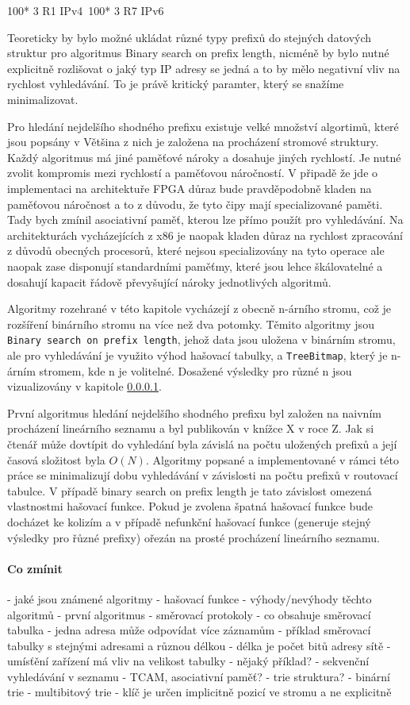 100* 3 R1 IPv4\
100* 3 R7 IPv6\

Teoreticky by bylo možné ukládat různé typy prefixů do stejných datových struktur pro algoritmus
Binary search on prefix length, nicméně by bylo nutné explicitně rozlišovat o jaký typ IP adresy se
jedná a to by mělo negativní vliv na rychlost vyhledávání. To je právě kritický paramter, který
se snažíme minimalizovat.

Pro hledání nejdelšího shodného prefixu existuje velké množství algortimů, které jsou popsány v \cite{}
Většina z nich je založena na procházení stromové struktury. Každý algoritmus má jiné paměťové nároky
a dosahuje jiných rychlostí. Je nutné zvolit kompromis mezi rychlostí a paměťovou náročností.
V připadě že jde o implementaci na architektuře FPGA důraz bude pravděpodobně kladen na paměťovou náročnost
a to z důvodu, že tyto čipy mají specializované paměti. Tady bych zmínil asociativní paměť, kterou
lze přímo použít pro vyhledávání. Na architekturách vycházejících z x86 je naopak kladen důraz
na rychlost zpracování z důvodů obecných procesorů, které nejsou specializovány na tyto operace
ale naopak zase disponují standardními paměťmy, které jsou lehce škálovatelné a dosahují kapacit
řádově převyšující nároky jednotlivých algoritmů.

Algoritmy rozehrané v této kapitole vycházejí z obecně n-árního stromu,
což je rozšíření binárního stromu na více než dva potomky. Těmito algoritmy jsou
\texttt{Binary search on prefix length}, jehož data jsou uložena v binárním stromu, ale pro vyhledávání
je využito výhod hašovací tabulky, a \texttt{TreeBitmap}, který je n-árním stromem, kde n je volitelné.
Dosažené výsledky pro různé n jsou vizualizovány v kapitole \ref{}.

První algoritmus hledání nejdelšího shodného prefixu byl založen na naivním procházení lineárního
seznamu a byl publikován v knížce X v roce Z. Jak si čtenář může dovtípit do vyhledání
byla závislá na počtu uložených prefixů a její časová složitost byla $O(N)$.
Algoritmy popsané a implementované v rámci této práce se minimalizují dobu vyhledávání v závislosti
na počtu prefixů v routovací tabulce. V případě binary search on prefix length je tato závislost
omezená vlastnostmi hašovací funkce. Pokud je zvolena špatná hašovací funkce bude docházet ke kolizím
a v případě nefunkční hašovací funkce (generuje stejný výsledky pro řůzné prefixy)
ořezán na prosté procházení lineárního seznamu.


\paragraph{Co zmínit}
- jaké jsou známené algoritmy
- hašovací funkce
- výhody/nevýhody těchto algoritmů
- první algoritmus
- směrovací protokoly
- co obsahuje směrovací tabulka
- jedna adresa může odpovídat více záznamům
- příklad směrovací tabulky s stejnými adresami a různou délkou
- délka je počet bitů adresy sítě
- umísťění zařízení má vliv na velikost tabulky - nějaký příklad?
- sekvenční vyhledávání v seznamu
- TCAM, asociativní paměť?
- trie struktura?
- binární trie
- multibitový trie
- klíč je určen implicitně pozicí ve stromu a ne explicitně


